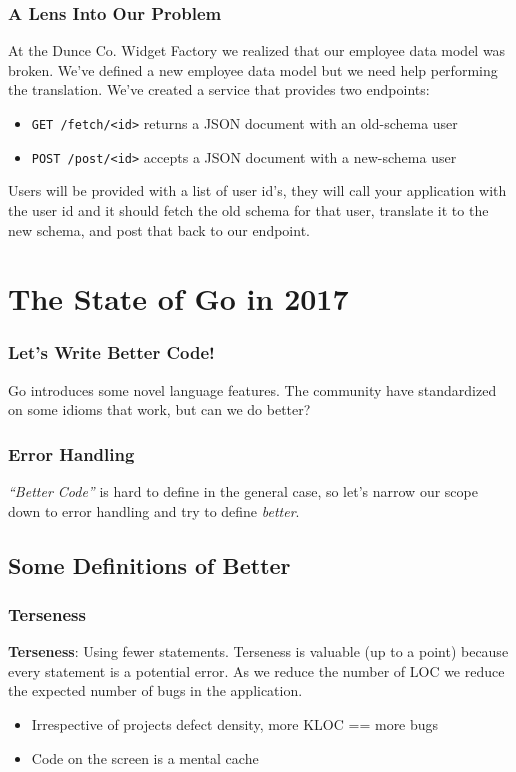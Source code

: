 \documentclass{beamer}
\begin{document}
\begin{frame}[fragile]
  \frametitle{A Lens Into Our Problem}
  At the Dunce Co. Widget Factory we realized that our employee data
  model was broken.  We've defined a new employee data model but we
  need help performing the translation. We've created a service that
  provides two endpoints:\\
  \vfill
  \begin{itemize}
  \item {\tt GET /fetch/<id>} returns a JSON document with an old-schema user
  \item {\tt POST /post/<id>} accepts a JSON document with a new-schema user
  \end{itemize}
  \vfill
  Users will be provided with a list of user id's, they will call your
  application with the user id and it should fetch the old schema for
  that user, translate it to the new schema, and post that back to our
  endpoint.
\end{frame}

\section{The State of Go in 2017}
\begin{frame}
  \frametitle{Let's Write Better Code!}
  Go introduces some novel language features.  The community have
  standardized on some idioms that work, but can we do better?
\end{frame}

\begin{frame}
  \frametitle{Error Handling}
  {\it ``Better Code''} is hard to define in the general case, so let's
  narrow our scope down to error handling and try to define
  {\it better}.
\end{frame}

\subsection{Some Definitions of Better}
\begin{frame}
  \frametitle{Terseness}
  {\bf Terseness}: Using fewer statements.
  \vfill
  Terseness is valuable (up to a point) because every statement is a
  potential error.  As we reduce the number of LOC we reduce the
  expected number of bugs in the application.
  \vfill
  \begin{itemize}
  \item Irrespective of projects defect density, more KLOC == more bugs
  \item Code on the screen is a mental cache
  \end{itemize}
\end{frame}
\end{document}
